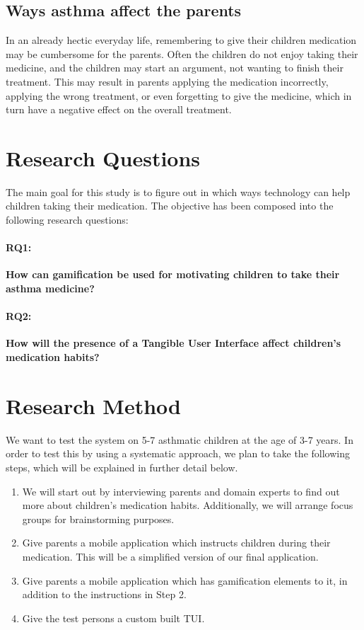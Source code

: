 \subsection{Ways asthma affect the parents}
In an already hectic everyday life, remembering to give their children medication may be cumbersome for the parents. Often the children do not enjoy taking their medicine, and the children may start an argument, not wanting to finish their treatment. This may result in parents applying the medication incorrectly, applying the wrong treatment, or even forgetting to give the medicine, which in turn have a negative effect on the overall treatment.  



\section{Research Questions}
\label{sec:researchquestions}
The main goal for this study is to figure out in which ways technology can help children taking their medication. The objective has been composed into the following research questions: 

\paragraph{RQ1:}
\textbf{How can gamification be used for motivating children to take their asthma medicine?}


\paragraph{RQ2:}
\textbf{How will the presence of a Tangible User Interface affect children's medication habits?}

\section{Research Method}
\label{sec:researchmethod}

We want to test the system on 5-7 asthmatic children at the age of 3-7 years. In order to test this by using a systematic approach, we plan to take the following steps, which will be explained in further detail below. 

\begin{enumerate}
  \item We will start out by interviewing parents and domain experts to find out more about children's medication habits. Additionally, we will arrange focus groups for brainstorming purposes.
  \item Give parents a mobile application which instructs children during their medication. This will be a simplified version of our final application.  
  \item Give parents a mobile application which has gamification elements to it, in addition to the instructions in Step 2. 
  \item Give the test persons a custom built TUI. 
\end{enumerate}
 

